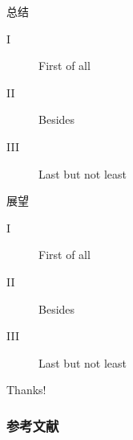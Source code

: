 \documentclass[hyperref,UTF8,11pt]{beamer}
\begin{document}
\begin{frame}{总结}
    \begin{description}
        \item[I] First of all
        \item[II] Besides
        \item[III] Last but not least
    \end{description}
\end{frame}

\begin{frame}{展望}
    \begin{description}
        \item[I] First of all
        \item[II] Besides
        \item[III] Last but not least
    \end{description}
\end{frame}

\begin{frame}
    \begin{center}
        \textcolor{scured}{\Huge\calligra Thanks!}
    \end{center}
\end{frame}

\begin{frame}[allowframebreaks]
    \frametitle{参考文献}
    \renewcommand{\bibfont}{\scriptsize}  %
    \printbibliography
\end{frame}
\end{document}
